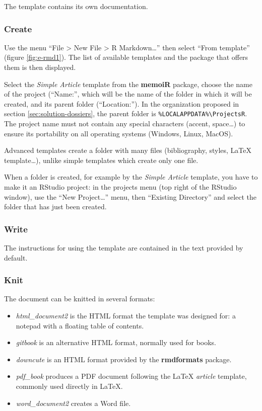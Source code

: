 \documentclass[
  12pt,
  american,
  a4paper,
  extrafontsizes,onecolumn,openright
  ]{memoir}
\providecommand{\tightlist}{%
  \setlength{\itemsep}{0pt}\setlength{\parskip}{0pt}}
\begin{document}
The template contains its own documentation.

\hypertarget{create}{%
\subsubsection{Create}\label{create}}

Use the menu \enquote{File \textgreater{} New File \textgreater{} R Markdown\ldots{}} then select \enquote{From template} (figure \ref{fig:e-rmd1}).
The list of available templates and the package that offers them is then displayed.

Select the \emph{Simple Article} template from the \textbf{memoiR} package, choose the name of the project (\enquote{Name:}, which will be the name of the folder in which it will be created, and its parent folder (\enquote{Location:}).
In the organization proposed in section \ref{sec:solution-dossiers}, the parent folder is \texttt{\%LOCALAPPDATA\%\textbackslash{}ProjectsR}.
The project name must not contain any special characters (accent, space\ldots) to ensure its portability on all operating systems (Windows, Linux, MacOS).

Advanced templates create a folder with many files (bibliography, styles, LaTeX template\ldots), unlike simple templates which create only one file.

When a folder is created, for example by the \emph{Simple Article} template, you have to make it an RStudio project: in the projects menu (top right of the RStudio window), use the \enquote{New Project\ldots{}} menu, then \enquote{Existing Directory} and select the folder that has just been created.

\hypertarget{write}{%
\subsubsection{Write}\label{write}}

The instructions for using the template are contained in the text provided by default.

\hypertarget{knit}{%
\subsubsection{Knit}\label{knit}}

The document can be knitted in several formats:

\begin{itemize}
\tightlist
\item
  \emph{html\_document2} is the HTML format the template was designed for: a notepad with a floating table of contents.
\item
  \emph{gitbook} is an alternative HTML format, normally used for books.
\item
  \emph{downcute} is an HTML format provided by the \textbf{rmdformats} package.
\item
  \emph{pdf\_book} produces a PDF document following the LaTeX \emph{article} template, commonly used directly in LaTeX.
\item
  \emph{word\_document2} creates a Word file.
\end{itemize}
\end{document}
